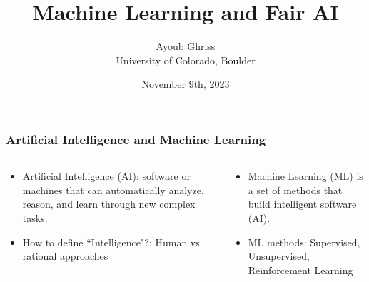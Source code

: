 \documentclass[aspectratio=169]{beamer}
\title{Machine Learning and Fair AI}
\author{Ayoub Ghriss\\ University of Colorado, Boulder}
\date{November 9th, 2023}
\begin{document}
\frame{\titlepage}


\begin{frame}
	\frametitle{Artificial Intelligence and Machine Learning}
	\begin{columns}
		\begin{column}{0.5\textwidth}
			\begin{itemize}
				\item Artificial Intelligence (AI): software or machines that can
				      automatically analyze, reason, and learn through new complex
				      tasks.
				\item How to define ``Intelligence"?: Human vs rational approaches
			\end{itemize}
		\end{column}
		\begin{column}{0.5\textwidth}
			\begin{itemize}
				\item Machine Learning (ML) is a set of methods that build
				      intelligent software (AI).
				\item ML methods: Supervised, Unsupervised, Reinforcement Learning
			\end{itemize}
		\end{column}
	\end{columns}
\end{frame}
\begin{frame}
	\tableofcontents
\end{frame}
\end{document}
